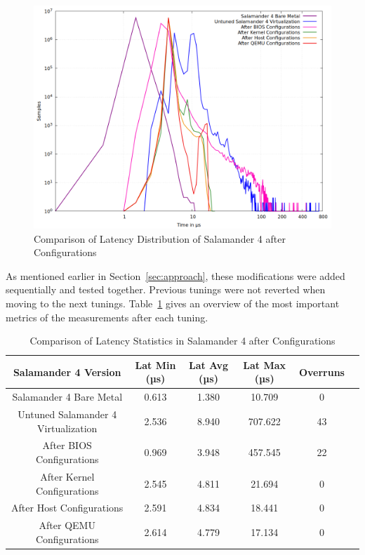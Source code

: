 \documentclass[MMR,Master,english]{style/twbook}
\begin{document}
\begin{figure}[H]
	\centering
	\includegraphics[width=0.70\columnwidth]{img/results/gnuplot_combined_max_latency_all.png}
	\caption[Comparison of Latency Distribution of Salamander 4 Configurations]{Comparison of Latency Distribution of Salamander 4 after Configurations}
	\label{fig:max_latency_combined_results}
\end{figure}

\noindent As mentioned earlier in Section~\ref{sec:approach}, these modifications were added sequentially and tested together. Previous tunings were not reverted when moving to the next tunings. Table~\ref{tab:latency_tables_combined} gives an overview of the most important metrics of the measurements after each tuning.

\begin{table}[H]
	\centering
	\small
	\caption{Comparison of Latency Statistics in Salamander 4 after Configurations}
	\label{tab:latency_tables_combined}
	\begin{tabular}{|c|c|c|c|c|c|}
		\hline
		\textbf{Salamander 4 Version}      & \textbf{Lat Min (µs)} & \textbf{Lat Avg (µs)} & \textbf{Lat Max (µs)} & \textbf{Overruns} \\ \hline
		Salamander 4 Bare Metal      & 0.613                 & 1.380                 & 10.709                & 0                 \\ \hline
		Untuned Salamander 4 Virtualization & 2.536                 & 8.940                 & 707.622               & 43                \\ \hline
		After BIOS Configurations     & 0.969                 & 3.948                 & 457.545               & 22                \\ \hline
		After Kernel Configurations   & 2.545                 & 4.811                 & 21.694                & 0                 \\ \hline
		After Host Configurations     & 2.591                 & 4.834                 & 18.441                & 0                 \\ \hline
		After QEMU Configurations     & 2.614                 & 4.779                 & 17.134                & 0                 \\ \hline
	\end{tabular}
\end{table}
\end{document}
